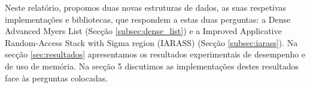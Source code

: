 Neste relatório, propomos duas novas estruturas de dados, as suas respetivas implementações e bibliotecas, que respondem a estas
duas perguntas: a Dense Advanced Myers List (Secção \ref{subsec:dense_list}) e a Improved Applicative Random-Access Stack with Sigma region (IARASS) (Secção \ref{subsec:iarass}). 
Na secção \ref{sec:resultados} apresentamos os resultados experimentais de desempenho e de uso de memória. Na secção 5 discutimos as implementações destes
resultados face às perguntas colocadas.
